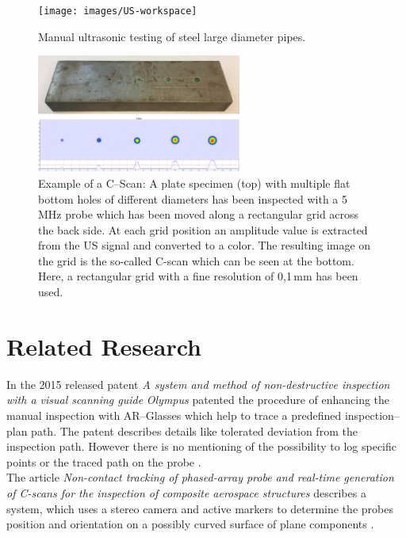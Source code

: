\documentclass{VRARWorkshop}
\begin{document}
\begin{figure}[h!]
    \begin{center}
        \texttt{[image: images/US-workspace]}
        \caption{\label{fig:manual_UT} Manual ultrasonic testing of steel large diameter pipes.}
    \end{center}
\end{figure}
\begin{figure}[h!]
    \begin{center}
        \includegraphics[width=0.6\textwidth]{images/CScan}
        \caption{\label{fig:cScan} Example of a C--Scan: A plate specimen (top) with multiple flat bottom holes of different diameters has been inspected with a 5 MHz probe which has been moved along a rectangular grid across the back side. At each grid position an amplitude value is extracted from the US signal and converted to a color. The resulting image on the grid is the so-called C-scan which can be seen at the bottom.
				Here, a rectangular grid with a fine resolution of 0,1\,mm has been used.}
    \end{center}
\end{figure}

\section{Related Research}
In the 2015 released patent \textit{A system and method of non-destructive inspection with a visual scanning guide} \textit{Olympus} patented the procedure of enhancing the manual inspection with AR--Glasses which help to trace a predefined inspection--plan path.
The patent describes details like tolerated deviation from the inspection path.
However there is no mentioning of the possibility to log specific points or the traced path on the probe \cite{ARPat15}.\\

The article \textit{Non-contact tracking of phased-array probe and real-time generation of C-scans for the inspection of composite aerospace structures} describes a system, which uses a stereo camera and active markers to determine the probes position and orientation on a possibly curved surface of plane components \cite{walter_non-contact_2007}.\\
\end{document}
